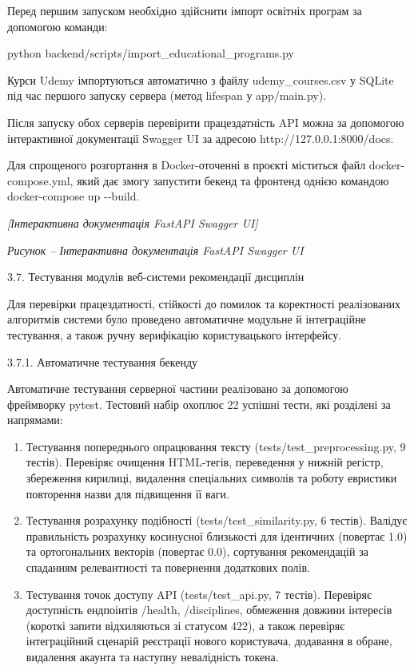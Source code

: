 \documentclass[
]{article}
\begin{document}
Перед першим запуском необхідно здійснити імпорт освітніх програм за
допомогою команди:

python backend/scripts/import\_educational\_programs.py

Курси Udemy імпортуються автоматично з файлу udemy\_courses.csv у SQLite
під час першого запуску сервера (метод lifespan у app/main.py).

Після запуску обох серверів перевірити працездатність API можна за
допомогою інтерактивної документації Swagger UI за адресою
http://127.0.0.1:8000/docs.

Для спрощеного розгортання в Docker-оточенні в проєкті міститься файл
docker-compose.yml, який дає змогу запустити бекенд та фронтенд однією
командою docker-compose up -\/-build.

\emph{{[}Інтерактивна документація FastAPI Swagger UI{]}}

\emph{Рисунок -- Інтерактивна документація FastAPI Swagger UI}

\protect{}\label{_Toc230434102}{}3.7. Тестування модулів
веб-системи рекомендації дисциплін

Для перевірки працездатності, стійкості до помилок та коректності
реалізованих алгоритмів системи було проведено автоматичне модульне й
інтеграційне тестування, а також ручну верифікацію користувацького
інтерфейсу.

3.7.1. Автоматичне тестування бекенду

Автоматичне тестування серверної частини реалізовано за допомогою
фреймворку pytest. Тестовий набір охоплює 22 успішні тести, які
розділені за напрямами:

\begin{enumerate}
\def\labelenumi{\arabic{enumi}.}
\item
  Тестування попереднього опрацювання тексту
  (tests/test\_preprocessing.py, 9 тестів). Перевіряє очищення
  HTML-тегів, переведення у нижній регістр, збереження кирилиці,
  видалення спеціальних символів та роботу евристики повторення назви
  для підвищення її ваги.
\item
  Тестування розрахунку подібності (tests/test\_similarity.py, 6
  тестів). Валідує правильність розрахунку косинусної близькості для
  ідентичних (повертає 1.0) та ортогональних векторів (повертає 0.0),
  сортування рекомендацій за спаданням релевантності та повернення
  додаткових полів.
\item
  Тестування точок доступу API (tests/test\_api.py, 7 тестів). Перевіряє
  доступність ендпоінтів /health, /disciplines, обмеження довжини
  інтересів (короткі запити відхиляються зі статусом 422), а також
  перевіряє інтеграційний сценарій реєстрації нового користувача,
  додавання в обране, видалення акаунта та наступну невалідність токена.
\end{enumerate}
\end{document}
